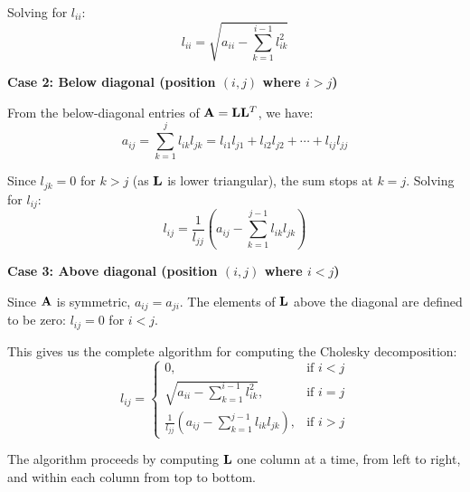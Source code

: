 \documentclass[../readings.tex]{subfiles}
\begin{document}
{Solving for $l_{ii}$:
$$
l_{ii} = \sqrt{a_{ii} - \sum_{k=1}^{i-1} l_{ik}^2}
$$

\textbf{Case 2: Below diagonal (position $(i,j)$ where $i > j$)}

From the below-diagonal entries of $\mathbf{A} = \mathbf{L}\mathbf{L}^T$, we have:
$$
a_{ij} = \sum_{k=1}^{j} l_{ik}l_{jk} = l_{i1}l_{j1} + l_{i2}l_{j2} + \cdots + l_{ij}l_{jj}
$$

Since $l_{jk} = 0$ for $k > j$ (as $\mathbf{L}$ is lower triangular), the sum stops at $k = j$. 
Solving for $l_{ij}$:
$$
l_{ij} = \frac{1}{l_{jj}}\left(a_{ij} - \sum_{k=1}^{j-1} l_{ik}l_{jk}\right)
$$

\textbf{Case 3: Above diagonal (position $(i,j)$ where $i < j$)}

Since $\mathbf{A}$ is symmetric, $a_{ij} = a_{ji}$. The elements of $\mathbf{L}$ above the diagonal are defined to be zero: $l_{ij} = 0$ for $i < j$.

This gives us the complete algorithm for computing the Cholesky decomposition:
$$
l_{ij} = 
\begin{cases}
0, & \text{if } i < j \\
\sqrt{a_{ii} - \sum_{k=1}^{i-1} l_{ik}^2}, & \text{if } i = j \\
\frac{1}{l_{jj}} \left( a_{ij} - \sum_{k=1}^{j-1} l_{ik}l_{jk} \right), & \text{if } i > j
\end{cases}
$$

The algorithm proceeds by computing $\mathbf{L}$ one column at a time, from left to right, and within each column from top to bottom.
}

\end{document}
